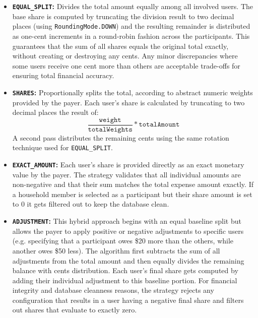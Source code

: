 \begin{itemize}
    \item \textbf{\texttt{EQUAL\_SPLIT}:} Divides the total amount equally among all involved users. The base share is computed by truncating the division result to two decimal places (using \texttt{RoundingMode.DOWN}) and the resulting remainder is distributed as one-cent increments in a round-robin fashion across the participants. This guarantees that the sum of all shares equals the original total exactly, without creating or destroying any cents. Any minor discrepancies where some users receive one cent more than others are acceptable trade-offs for ensuring total financial accuracy.

    \item \textbf{\texttt{SHARES}:} Proportionally splits the total, according to abstract numeric weights provided by the payer. Each user's share is calculated by truncating to two decimal places the result of: $${\frac{\texttt{weight}}{\texttt{totalWeights}} * \texttt{totalAmount}}$$ A second pass distributes the remaining cents using the same rotation technique used for \texttt{EQUAL\_SPLIT}.

    \item \textbf{\texttt{EXACT\_AMOUNT}:} Each user's share is provided directly as an exact monetary value by the payer. The strategy validates that all individual amounts are non-negative and that their sum matches the total expense amount exactly. If a household member is selected as a participant but their share amount is set to 0 it gets filtered out to keep the database clean.

    \item \textbf{\texttt{ADJUSTMENT}:} This hybrid approach begins with an equal baseline split but allows the payer to apply positive or negative adjustments to specific users (e.g. specifying that a participant owes \$20 more than the others, while another owes \$50 less). The algorithm first subtracts the sum of all adjustments from the total amount and then equally divides the remaining balance with cents distribution. Each user's final share gets computed by adding their individual adjustment to this baseline portion. For financial integrity and database cleanness reasons, the strategy rejects any configuration that results in a user having a negative final share and filters out shares that evaluate to exactly zero.
\end{itemize}

